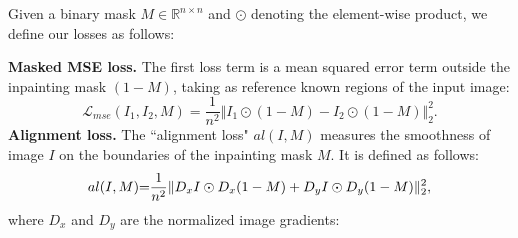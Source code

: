 

Given a binary mask $M \in \mathbb{R}^{n \times n}$ and $\odot$ denoting the element-wise product, we define our losses as follows:

\noindent \textbf{Masked MSE loss.} The first loss term is a mean squared error term outside the inpainting mask $(1 - M)$, taking as reference known regions of the input image:
\begin{equation}
    \mathcal{L}_{mse}(I_1, I_2, M) = \frac{1}{n^2}\Vert I_1 \odot (1 - M) - I_2 \odot (1 - M) \Vert_2^2. 
\end{equation}
\noindent \textbf{Alignment loss.} The ``alignment loss" $al(I, M)$ measures the smoothness of image $I$ on the boundaries of the inpainting mask $M$. It is defined as follows:
\vspace*{-.1cm}\begin{equation}
    al(I, M) \hspace{-0.1cm}=  \hspace{-0.1cm} \frac{1}{n^2}\Vert D_x I \odot D_x (1 - M) +D_y I \odot D_y (1 - M) \Vert_2^2, 
\end{equation}
where $D_x$ and $D_y$ are the normalized image gradients:



